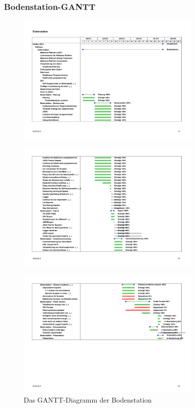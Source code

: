 \subsubsection {Bodenstation-GANTT}
\begin{figure}[H]
	\centering
	\includegraphics[trim = 25mm 50mm 46mm 65mm, clip,width=0.8\textwidth]{8_Anhang/bodenstation-gantt-1.png}
	\label{gantt_hardware_1}
\end{figure}
\vspace{-1,3cm}
\begin{figure}[H]
	\centering
	\includegraphics[trim = 30mm 50mm 45mm 40mm, clip,width=0.8\textwidth]{8_Anhang/bodenstation-gantt-2.png}
	\label{gantt_hardware_2}
\end{figure}
\vspace{-1,1cm}
\begin{figure}[H]
	\centering
	\includegraphics[trim = 30mm 200mm 45mm 40mm, clip,width=0.8\textwidth]{8_Anhang/bodenstation-gantt-3.png}
	\caption{Das GANTT-Diagramm der Bodenstation}
	\label{gantt_hardware_3}
\end{figure}
\newpage
